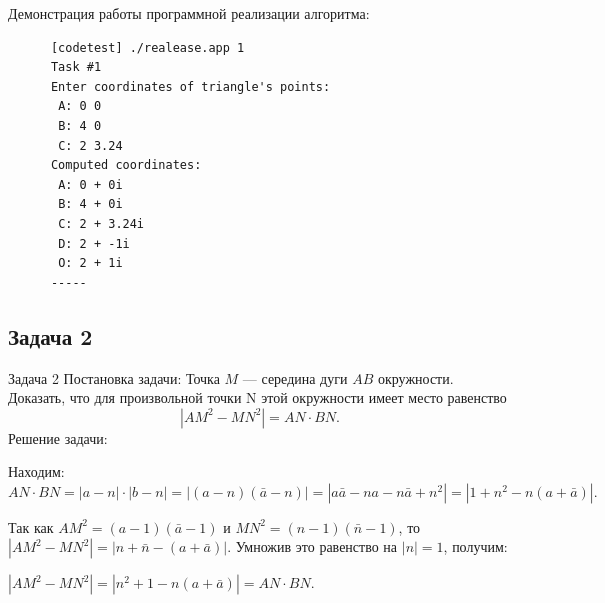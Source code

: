 \documentclass{beamer}
\begin{document}
\begin{frame}[fragile]
   Демонстрация работы программной реализации алгоритма:
   \begin{verbatim}
      [codetest] ./realease.app 1
      Task #1
      Enter coordinates of triangle's points:
       A: 0 0
       B: 4 0
       C: 2 3.24
      Computed coordinates:
       A: 0 + 0i
       B: 4 + 0i
       C: 2 + 3.24i
       D: 2 + -1i
       O: 2 + 1i
      -----
   \end{verbatim}
\end{frame}

\begin{frame}
   \subsection{Задача 2}
   \begin{block}{Задача 2}
      Постановка задачи:
      Точка \(M\) --- середина дуги \(AB\) окружности.
      Доказать, что для произвольной точки N этой
      окружности имеет место
      равенство
      \begin{equation}
         \left\lvert AM^2-MN^2 \right\rvert = AN \cdot BN.
         \label{t2:f1}
      \end{equation}
      Решение задачи:

      Находим:
      \(AN \cdot BN = \left\lvert a-n \right\rvert \cdot \left\lvert b-n \right\rvert
      = \left\lvert (a-n)(\bar{a}-n)\right\rvert
      = \left\lvert a\bar{a} - na - n\bar{a} + n^2 \right\rvert
      = \left\lvert 1 + n^2 - n(a+\bar{a})\right\rvert.\)
      \bigskip

      Так как \(AM^2 =(a-1)(\bar{a}-1)\) и \(MN^2 =(n-1)(\bar{n}-1)\), то
      \(\left\lvert AM^2 - MN^2 \right\rvert = \left\lvert n+\bar{n}-(a+\bar{a}) \right\rvert\).
      Умножив это равенство на \(\left\lvert n \right\rvert=1\), получим:

      \(\left\lvert AM^2 - MN^2 \right\rvert = \left\lvert n^2 +1-n(a+\bar{a})\right\rvert = AN \cdot BN\).
   \end{block}
\end{frame}
\end{document}
